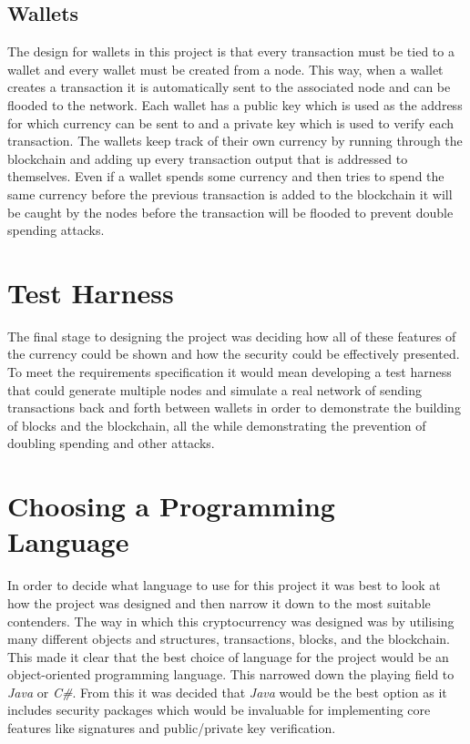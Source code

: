 \documentclass{l4proj}
\begin{document}
\subsection{Wallets}
The design for wallets in this project is that every transaction must be tied to a wallet and every wallet
must be created from a node. This way, when a wallet creates a transaction it is automatically sent to the
associated node and can be flooded to the network. Each wallet has a public key which is used as the address
for which currency can be sent to and a private key which is used to verify each transaction. The wallets 
keep track of their own currency by running through the blockchain and adding up every transaction output
that is addressed to themselves. Even if a wallet spends some currency and then tries to spend the same
currency before the previous transaction is added to the blockchain it will be caught by the nodes before the
transaction will be flooded to prevent double spending attacks.

\section{Test Harness}
The final stage to designing the project was deciding how all of these features of the currency could be shown
and how the security could be effectively presented. To meet the requirements specification it would mean developing
a test harness that could generate multiple nodes and simulate a real network of sending transactions back and 
forth between wallets in order to demonstrate the building of blocks and the blockchain, all the while demonstrating
the prevention of doubling spending and other attacks. 

\section{Choosing a Programming Language}
In order to decide what language to use for this project it was best to look at how the project was designed
and then narrow it down to the most suitable contenders. The way in which this cryptocurrency was designed was 
by utilising many different objects and structures, transactions, blocks, and the blockchain. This made it clear that 
the best choice of language for the project would be an object-oriented programming language. This narrowed down
the playing field to \textit{Java} or \textit{C\#}. From this it was decided that \textit{Java} would be the best 
option as it includes security packages which would be invaluable for implementing core features like signatures and 
public/private key verification.
\end{document}
